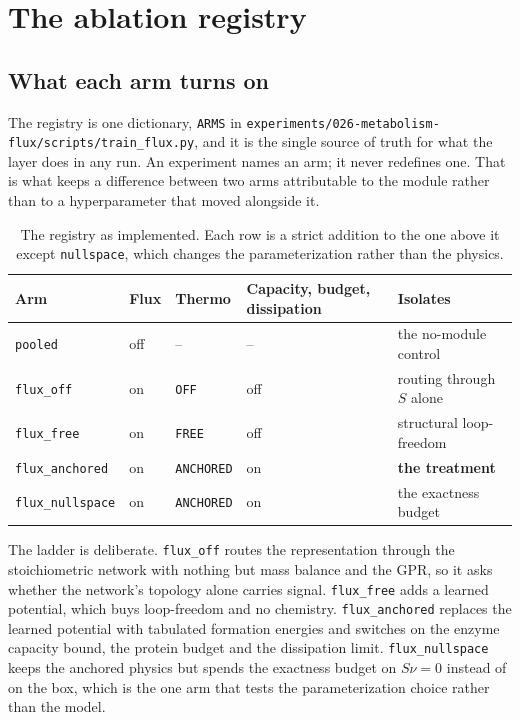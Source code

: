 
\section{The ablation registry}
\label{sec:arms}

\subsection{What each arm turns on}

The registry is one dictionary, \texttt{ARMS} in
\texttt{experiments/026-metabolism-flux/scripts/train\_flux.py}, and it is the single
source of truth for what the layer does in any run. An experiment names an arm; it never
redefines one. That is what keeps a difference between two arms attributable to the module
rather than to a hyperparameter that moved alongside it.

\begin{table}[H]
  \centering
  \footnotesize
  \caption[The arms]{The registry as implemented. Each row is a strict addition to the one
  above it except \texttt{nullspace}, which changes the parameterization rather than the
  physics.}
  \label{tab:arms}
  \begin{tabular}{@{}lllll@{}}
    \hline
    Arm & Flux & Thermo & Capacity, budget, dissipation & Isolates \\
    \hline
    \texttt{pooled} & off & -- & -- & the no-module control \\
    \texttt{flux\_off} & on & \texttt{OFF} & off & routing through $S$ alone \\
    \texttt{flux\_free} & on & \texttt{FREE} & off & structural loop-freedom \\
    \texttt{flux\_anchored} & on & \texttt{ANCHORED} & on & \textbf{the treatment} \\
    \texttt{flux\_nullspace} & on & \texttt{ANCHORED} & on & the exactness budget \\
    \hline
  \end{tabular}
\end{table}

The ladder is deliberate. \texttt{flux\_off} routes the representation through the
stoichiometric network with nothing but mass balance and the GPR, so it asks whether the
network's topology alone carries signal. \texttt{flux\_free} adds a learned potential,
which buys loop-freedom and no chemistry. \texttt{flux\_anchored} replaces the learned
potential with tabulated formation energies and switches on the enzyme capacity bound, the
protein budget and the dissipation limit. \texttt{flux\_nullspace} keeps the anchored
physics but spends the exactness budget on $S\nu = 0$ instead of on the box, which is the
one arm that tests the parameterization choice rather than the model.

